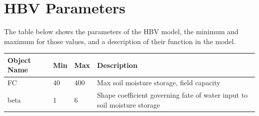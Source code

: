 \documentclass[
]{book}
\begin{document}
\hypertarget{hbv-parameters-1}{%
\section{HBV Parameters}\label{hbv-parameters-1}}

The table below shows the parameters of the HBV model, the minimum and maximum for those values, and a description of their function in the model.

\begin{longtable}[]{@{}llll@{}}
\toprule
\begin{minipage}[b]{0.29\columnwidth}\raggedright
Object Name\strut
\end{minipage} & \begin{minipage}[b]{0.16\columnwidth}\raggedright
Min\strut
\end{minipage} & \begin{minipage}[b]{0.13\columnwidth}\raggedright
Max\strut
\end{minipage} & \begin{minipage}[b]{0.31\columnwidth}\raggedright
Description\strut
\end{minipage}\tabularnewline
\midrule
\endhead
\begin{minipage}[t]{0.29\columnwidth}\raggedright
FC\strut
\end{minipage} & \begin{minipage}[t]{0.16\columnwidth}\raggedright
40\strut
\end{minipage} & \begin{minipage}[t]{0.13\columnwidth}\raggedright
400\strut
\end{minipage} & \begin{minipage}[t]{0.31\columnwidth}\raggedright
Max soil moisture storage, field capacity\strut
\end{minipage}\tabularnewline
\begin{minipage}[t]{0.29\columnwidth}\raggedright
beta\strut
\end{minipage} & \begin{minipage}[t]{0.16\columnwidth}\raggedright
1\strut
\end{minipage} & \begin{minipage}[t]{0.13\columnwidth}\raggedright
6\strut
\end{minipage} & \begin{minipage}[t]{0.31\columnwidth}\raggedright
Shape coefficient governing fate of water input to soil moisture storage\strut
\end{minipage}\tabularnewline

\end{longtable}
\end{document}
